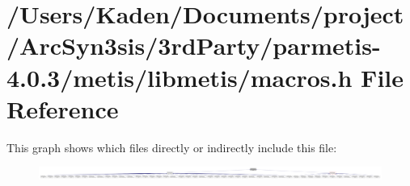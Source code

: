\hypertarget{a00921}{}\section{/\+Users/\+Kaden/\+Documents/project/\+Arc\+Syn3sis/3rd\+Party/parmetis-\/4.0.3/metis/libmetis/macros.h File Reference}
\label{a00921}
This graph shows which files directly or indirectly include this file\+:\nopagebreak
\begin{figure}[H]
\begin{center}
\leavevmode
\includegraphics[width=350pt]{a00923}
\end{center}
\end{figure}
